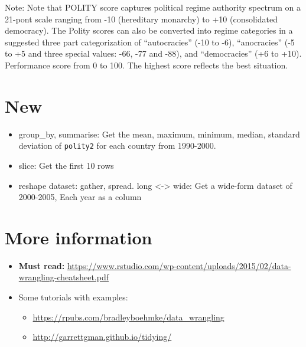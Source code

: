 \documentclass[11pt,]{article}
\providecommand{\tightlist}{%
  \setlength{\itemsep}{0pt}\setlength{\parskip}{0pt}}
\begin{document}
Note: Note that POLITY score captures political regime authority
spectrum on a 21-pont scale ranging from -10 (hereditary monarchy) to
+10 (consolidated democracy). The Polity scores can also be converted
into regime categories in a suggested three part categorization of
``autocracies'' (-10 to -6), ``anocracies'' (-5 to +5 and three special
values: -66, -77 and -88), and ``democracies'' (+6 to +10). Performance
score from 0 to 100. The highest score reflects the best situation.

\section{New}\label{new}

\begin{itemize}
\tightlist
\item
  group\_by, summarise: Get the mean, maximum, minimum, median, standard
  deviation of \texttt{polity2} for each country from 1990-2000.
\item
  slice: Get the first 10 rows
\item
  reshape dataset: gather, spread. long \textless{}-\textgreater{} wide:
  Get a wide-form dataset of 2000-2005, Each year as a column
\end{itemize}

\section{More information}\label{more-information}

\begin{itemize}
\tightlist
\item
  \textbf{Must read:}
  \url{https://www.rstudio.com/wp-content/uploads/2015/02/data-wrangling-cheatsheet.pdf}
\item
  Some tutorials with examples:

  \begin{itemize}
  \tightlist
  \item
    \url{https://rpubs.com/bradleyboehmke/data_wrangling}
  \item
    \url{http://garrettgman.github.io/tidying/}
  \end{itemize}
\end{itemize}
\end{document}
